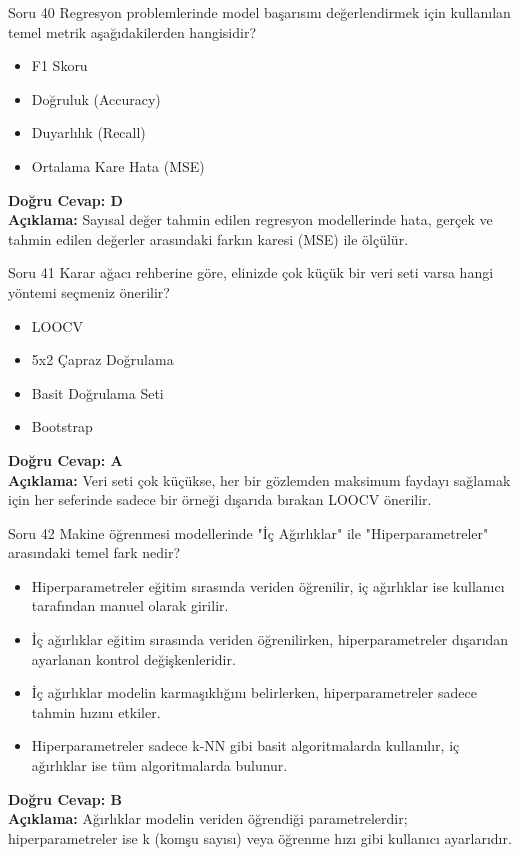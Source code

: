 \documentclass[12pt,a4paper]{article}
\begin{document}
\begin{testcard}{Soru 40}
    Regresyon problemlerinde model başarısını değerlendirmek için kullanılan temel metrik aşağıdakilerden hangisidir?
    \begin{itemize}
        \item[A)] F1 Skoru
        \item[B)] Doğruluk (Accuracy)
        \item[C)] Duyarlılık (Recall)
        \item[D)] Ortalama Kare Hata (MSE)
    \end{itemize}
    \tcblower
    \textbf{Doğru Cevap: D} \\
    \textbf{Açıklama:} Sayısal değer tahmin edilen regresyon modellerinde hata, gerçek ve tahmin edilen değerler arasındaki farkın karesi (MSE) ile ölçülür.
\end{testcard}

\begin{testcard}{Soru 41}
    Karar ağacı rehberine göre, elinizde çok küçük bir veri seti varsa hangi yöntemi seçmeniz önerilir?
    \begin{itemize}
        \item[A)] LOOCV
        \item[B)] 5x2 Çapraz Doğrulama
        \item[C)] Basit Doğrulama Seti
        \item[D)] Bootstrap
    \end{itemize}
    \tcblower
    \textbf{Doğru Cevap: A} \\
    \textbf{Açıklama:} Veri seti çok küçükse, her bir gözlemden maksimum faydayı sağlamak için her seferinde sadece bir örneği dışarıda bırakan LOOCV önerilir.
\end{testcard}

\begin{testcard}{Soru 42}
    Makine öğrenmesi modellerinde "İç Ağırlıklar" ile "Hiperparametreler" arasındaki temel fark nedir?
    \begin{itemize}
        \item[A)] Hiperparametreler eğitim sırasında veriden öğrenilir, iç ağırlıklar ise kullanıcı tarafından manuel olarak girilir.
        \item[B)] İç ağırlıklar eğitim sırasında veriden öğrenilirken, hiperparametreler dışarıdan ayarlanan kontrol değişkenleridir.
        \item[C)] İç ağırlıklar modelin karmaşıklığını belirlerken, hiperparametreler sadece tahmin hızını etkiler.
        \item[D)] Hiperparametreler sadece k-NN gibi basit algoritmalarda kullanılır, iç ağırlıklar ise tüm algoritmalarda bulunur.
    \end{itemize}
    \tcblower
    \textbf{Doğru Cevap: B} \\
    \textbf{Açıklama:} Ağırlıklar modelin veriden öğrendiği parametrelerdir; hiperparametreler ise k (komşu sayısı) veya öğrenme hızı gibi kullanıcı ayarlarıdır.
\end{testcard}
\end{document}
